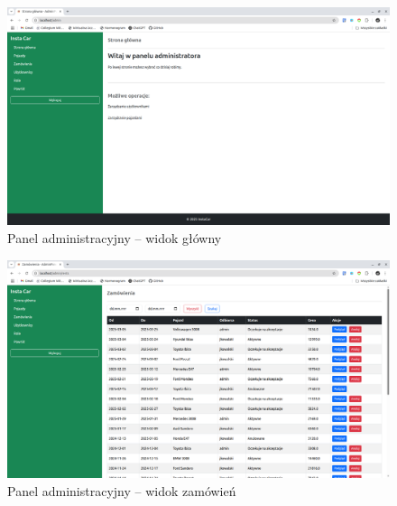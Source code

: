\documentclass[12pt]{article}
\begin{document}
	\begin{figure}[H]
		\centering
		\includegraphics[width=1\linewidth]{admin_panel}
		\caption{Panel administracyjny – widok główny}
		\label{fig:admin_panel}
	\end{figure}
	
	\begin{figure}[H]
		\centering
		\includegraphics[width=1\linewidth]{zamowienia}
		\caption{Panel administracyjny – widok zamówień}
		\label{fig:zamowienia}
	\end{figure}
	
	
\end{document}
